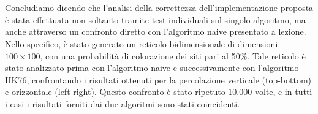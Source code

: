 \\\\
\noindent
Concludiamo dicendo che l'analisi della correttezza dell'implementazione proposta è stata effettuata non soltanto tramite test individuali sul singolo algoritmo, ma anche attraverso un confronto diretto con l'algoritmo naive presentato a lezione. Nello specifico, è stato generato un reticolo bidimensionale di dimensioni $100 \times 100$, con una probabilità di colorazione dei siti pari al 50\%. Tale reticolo è stato analizzato prima con l'algoritmo naive e successivamente con l'algoritmo HK76, confrontando i risultati ottenuti per la percolazione verticale (top-bottom) e orizzontale (left-right). Questo confronto è stato ripetuto $10.000$ volte, e in tutti i casi i risultati forniti dai due algoritmi sono stati coincidenti. 